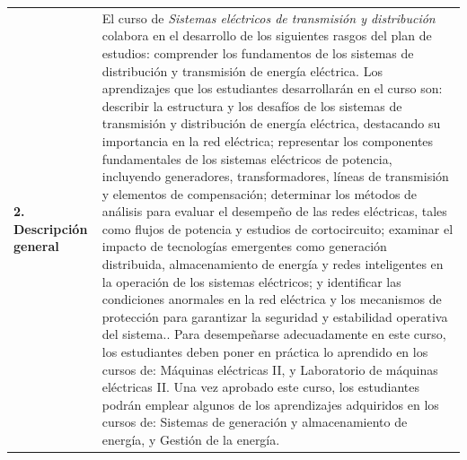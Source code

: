 \documentclass[letterpaper]{article}%
\begin{document}
\begin{tabularx}{\textwidth}{p{3cm}p{13cm}}%
\par\fontsize{12}{14}\selectfont \textbf{\textcolor{parte}{2. Descripción general}}&El curso de \emph{Sistemas eléctricos de transmisión y distribución} colabora en el desarrollo de los siguientes rasgos del plan de estudios: comprender los fundamentos de los sistemas de distribución y transmisión de energía eléctrica. \newline\newline Los aprendizajes que los estudiantes desarrollarán en el curso son: describir la estructura y los desafíos de los sistemas de transmisión y distribución de energía eléctrica, destacando su importancia en la red eléctrica; representar los componentes fundamentales de los sistemas eléctricos de potencia, incluyendo generadores, transformadores, líneas de transmisión y elementos de compensación; determinar los métodos de análisis para evaluar el desempeño de las redes eléctricas, tales como flujos de potencia y estudios de cortocircuito; examinar el impacto de tecnologías emergentes como generación distribuida, almacenamiento de energía y redes inteligentes en la operación de los sistemas eléctricos; y identificar las condiciones anormales en la red eléctrica y los mecanismos de protección para garantizar la seguridad y estabilidad operativa del sistema.. \newline\newline Para desempeñarse adecuadamente en este curso, los estudiantes deben poner en práctica lo aprendido en los cursos de: Máquinas eléctricas II, y Laboratorio de máquinas eléctricas II. \newline\newline Una vez aprobado este curso, los estudiantes podrán emplear algunos de los aprendizajes adquiridos en los cursos de: Sistemas de generación y almacenamiento de energía, y Gestión de la energía. \\%
\end{tabularx}%
\vspace*{4mm}%
\newline%
\end{document}
